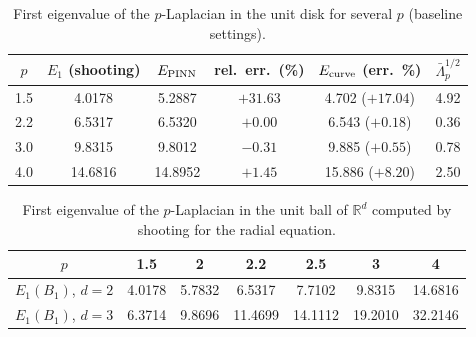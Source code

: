 \begin{table}[ht]
\centering
\begin{tabular}{cccccc}
\toprule
$p$ & $E_1$ (shooting) & $E_{\rm PINN}$ & rel.\ err.\ (\%) & $E_{\rm curve}$ (err.\ \%) & $\bar\Lambda_p^{1/2}$ \\
\midrule
1.5 & 4.0178 & 5.2887 & $+31.63$ & 4.702 ($+17.04$) & 4.92 \\
2.2 & 6.5317 & 6.5320 & $+0.00$ & 6.543 ($+0.18$) & 0.36 \\
3.0 & 9.8315 & 9.8012 & $-0.31$ & 9.885 ($+0.55$) & 0.78 \\
4.0 & 14.6816 & 14.8952 & $+1.45$ & 15.886 ($+8.20$) & 2.50 \\
\bottomrule
\end{tabular}
\caption{First eigenvalue of the $p$-Laplacian in the unit disk for several $p$ (baseline settings).}
\label{tab.plap.p}
\end{table}

\begin{table}[ht]
\centering
\begin{tabular}{ccccccc}
\toprule
$p$ & 1.5 & 2 & 2.2 & 2.5 & 3 & 4 \\
\midrule
$E_1(B_1)$, $d=2$ & 4.0178 & 5.7832 & 6.5317 & 7.7102 & 9.8315 & 14.6816 \\
$E_1(B_1)$, $d=3$ & 6.3714 & 9.8696 & 11.4699 & 14.1112 & 19.2010 & 32.2146 \\
\bottomrule
\end{tabular}
\caption{First eigenvalue of the $p$-Laplacian in the unit ball of $\mathbb R^d$ computed by shooting for the radial equation.}
\label{tab.plap.ref}
\end{table}

